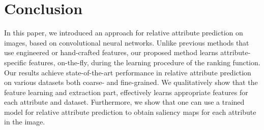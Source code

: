 

\section{Conclusion}
\label{sec.5}

In this paper, we introduced an approach for relative attribute prediction on images, based on convolutional neural networks. Unlike previous methods that use engineered or hand-crafted features, our proposed method learns attribute-specific features, on-the-fly, during the learning procedure of the ranking function. Our results achieve state-of-the-art performance in relative attribute prediction on various datasets both coarse- and fine-grained.
We qualitatively show that the feature learning and extraction part, effectively learns appropriate features for each attribute and dataset.
Furthermore, we show that one can use a trained model for relative attribute prediction to obtain saliency maps for each attribute in the image.
